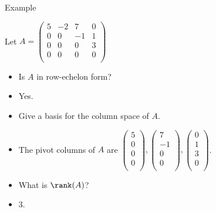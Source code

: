 \documentclass{beamer}
\begin{document}

\begin{frame}{Example}

Let
$
A=
\begin{pmatrix}
5 & -2 &  7  & 0 \\
0 & 0  & -1  & 1 \\
0 & 0  &  0  & 3 \\
0 & 0  &  0  & 0 \\
\end{pmatrix}
$
\begin{itemize}
\item Is $A$ in row-echelon form?
\item Yes.
\item Give a basis for the column space of $A$.
\item The pivot columns of $A$ are
$
\begin{pmatrix}
5 \\
0 \\
0 \\
0 \\
\end{pmatrix},
\begin{pmatrix}
 7 \\
-1 \\
 0 \\
 0 \\
\end{pmatrix},
\begin{pmatrix}
0 \\
1 \\
3 \\
0 \\
\end{pmatrix}
$.
\item What is $\rank(A)$?
\item 3.
\end{itemize}

\end{frame}

\end{document}
